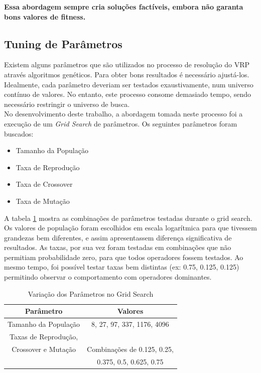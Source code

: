 \documentclass[conference]{IEEEtran}
\begin{document}
\textbf{Essa abordagem sempre cria soluções factíveis, embora não garanta bons valores de fitness.}


\subsection{Tuning de Parâmetros}
Existem alguns parâmetros que são utilizados no processo de resolução do VRP através algoritmos genéticos. Para obter bons resultados é necessário ajustá-los. Idealmente, cada parâmetro deveriam ser testados exaustivamente, num universo contínuo de valores. No entanto, este processo consome demasiado tempo, sendo necessário restringir o universo de busca.\\
No desenvolvimento deste trabalho, a abordagem tomada neste processo foi a execução de um \textit{Grid Search} de parâmetros. Os seguintes parâmetros foram buscados:
\begin{itemize}
\item Tamanho da População
\item Taxa de Reprodução
\item Taxa de Crossover
\item Taxa de Mutação
\end{itemize}

A tabela \ref{table_tuning_parameters} mostra as combinações de parâmetros testadas durante o grid search. Os valores de população foram escolhidos em escala logarítmica para que tivessem grandezas bem diferentes, e assim apresentassem diferença significativa de resultados. As taxas, por sua vez foram testadas em combinações que não permitiam probabilidade zero, para que todos operadores fossem testados. Ao mesmo tempo, foi possível testar taxas bem distintas (ex: 0.75, 0.125, 0.125) permitindo observar o comportamento com operadores dominantes.

\begin{table}[!t]
\renewcommand{\arraystretch}{1.3}
\centering
\caption{Variação dos Parâmetros no Grid Search}
\label{table_tuning_parameters}
\begin{tabular}{|c||c|}
\hline
Parâmetro & Valores\\
\hline
Tamanho da População & 8, 27, 97, 337, 1176, 4096\\
\hline
Taxas de Reprodução, \\Crossover e Mutação & Combinações de 0.125, 0.25, \\ & 0.375, 0.5, 0.625, 0.75\\
\hline
\end{tabular}
\end{table}
\end{document}
